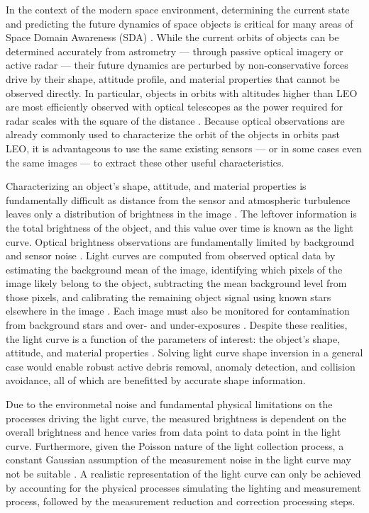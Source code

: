In the context of the modern space environment, determining the current state and predicting the future dynamics of space objects is critical for many areas of Space Domain Awareness (SDA) \cite{frueh2019notes}. While the current orbits of objects can be determined accurately from astrometry --- through passive optical imagery or active radar --- their future dynamics are perturbed by non-conservative forces drive by their shape, attitude profile, and material properties that cannot be observed directly. In particular, objects in orbits with altitudes higher than LEO are most efficiently observed with optical telescopes as the power required for radar scales with the square of the distance \cite{frueh2019notes}. Because optical observations are already commonly used to characterize the orbit of the objects in orbits past LEO, it is advantageous to use the same existing sensors --- or in some cases even the same images --- to extract these other useful characteristics. 

Characterizing an object's shape, attitude, and material properties is fundamentally difficult as distance from the sensor and atmospheric turbulence leaves only a distribution of brightness in the image \cite{fan2020thesis}. The leftover information is the total brightness of the object, and this value over time is known as the light curve. Optical brightness observations are fundamentally limited by background and sensor noise \cite{frueh2019notes}. Light curves are computed from observed optical data by estimating the background mean of the image, identifying which pixels of the image likely belong to the object, subtracting the mean background level from those pixels, and calibrating the remaining object signal using known stars elsewhere in the image \cite{schildknecht2008}. Each image must also be monitored for contamination from background stars and over- and under-exposures \cite{schildknecht2015}. Despite these realities, the light curve is a function of the parameters of interest: the object's shape, attitude, and material properties \cite{fan2020thesis, burton2021mapping}. Solving light curve shape inversion in a general case would enable robust active debris removal, anomaly detection, and collision avoidance, all of which are benefitted by accurate shape information.

Due to the environmetal noise and fundamental physical limitations on the processes driving the light curve, the measured brightness is dependent on the overall brightness and hence varies from data point to data point in the light curve. Furthermore, given the Poisson nature of the light collection process, a constant Gaussian assumption of the measurement noise in the light curve may not be suitable \cite{fan2020thesis, krag2003}. A realistic representation of the light curve can only be achieved by accounting for the physical processes simulating the lighting and measurement process, followed by the measurement reduction and correction processing steps. 

